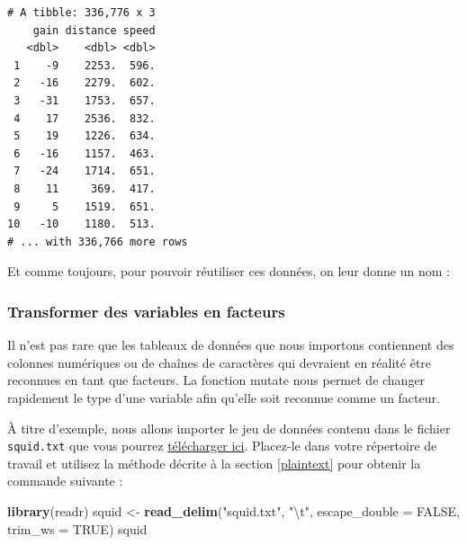 \documentclass[a4paperpaper,]{article}
\newenvironment{Shaded}{\begin{snugshade}}{\end{snugshade}}
\newcommand{\KeywordTok}[1]{\textcolor[rgb]{0.13,0.29,0.53}{\textbf{#1}}}
\newcommand{\DataTypeTok}[1]{\textcolor[rgb]{0.13,0.29,0.53}{#1}}
\newcommand{\DecValTok}[1]{\textcolor[rgb]{0.00,0.00,0.81}{#1}}
\newcommand{\FloatTok}[1]{\textcolor[rgb]{0.00,0.00,0.81}{#1}}
\newcommand{\CharTok}[1]{\textcolor[rgb]{0.31,0.60,0.02}{#1}}
\newcommand{\StringTok}[1]{\textcolor[rgb]{0.31,0.60,0.02}{#1}}
\newcommand{\OtherTok}[1]{\textcolor[rgb]{0.56,0.35,0.01}{#1}}
\newcommand{\OperatorTok}[1]{\textcolor[rgb]{0.81,0.36,0.00}{\textbf{#1}}}
\newcommand{\NormalTok}[1]{#1}
\theoremstyle{definition}
\theoremstyle{definition}
\theoremstyle{definition}
\theoremstyle{remark}
\begin{document}
\begin{verbatim}
# A tibble: 336,776 x 3
    gain distance speed
   <dbl>    <dbl> <dbl>
 1    -9    2253.  596.
 2   -16    2279.  602.
 3   -31    1753.  657.
 4    17    2536.  832.
 5    19    1226.  634.
 6   -16    1157.  463.
 7   -24    1714.  651.
 8    11     369.  417.
 9     5    1519.  651.
10   -10    1180.  513.
# ... with 336,766 more rows
\end{verbatim}

Et comme toujours, pour pouvoir réutiliser ces données, on leur donne un
nom :

\begin{Shaded}
\end{Shaded}

\subsubsection{Transformer des variables en
facteurs}\label{transformer-des-variables-en-facteurs}

Il n'est pas rare que les tableaux de données que nous importons
contiennent des colonnes numériques ou de chaînes de caractères qui
devraient en réalité être reconnues en tant que facteurs. La fonction
mutate nous permet de changer rapidement le type d'une variable afin
qu'elle soit reconnue comme un facteur.

À titre d'exemple, nous allons importer le jeu de données contenu dans
le fichier \texttt{squid.txt} que vous pourrez
\href{data/squid.txt}{télécharger ici}. Placez-le dans votre répertoire
de travail et utilisez la méthode décrite à la section \ref{plaintext}
pour obtenir la commande suivante :

\begin{Shaded}
\begin{Highlighting}[]
\KeywordTok{library}\NormalTok{(readr)}
\NormalTok{squid <-}\StringTok{ }\KeywordTok{read_delim}\NormalTok{(}\StringTok{"squid.txt"}\NormalTok{, }\StringTok{"}\CharTok{\textbackslash{}t}\StringTok{"}\NormalTok{, }
    \DataTypeTok{escape_double =} \OtherTok{FALSE}\NormalTok{, }\DataTypeTok{trim_ws =} \OtherTok{TRUE}\NormalTok{)}
\NormalTok{squid}
\end{Highlighting}
\end{Shaded}
\end{document}
